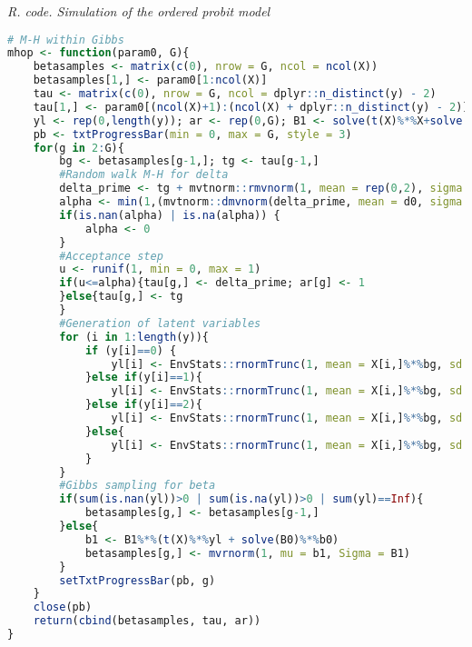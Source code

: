 \begin{enumerate}[leftmargin=*]
\begin{tcolorbox}[enhanced,width=4.67in,center upper,
	fontupper=\large\bfseries,drop shadow southwest,sharp corners]
	\textit{R. code. Simulation of the ordered probit model}
	\begin{VF}
		\begin{lstlisting}[language=R]
# M-H within Gibbs
mhop <- function(param0, G){
	betasamples <- matrix(c(0), nrow = G, ncol = ncol(X))
	betasamples[1,] <- param0[1:ncol(X)]
	tau <- matrix(c(0), nrow = G, ncol = dplyr::n_distinct(y) - 2)
	tau[1,] <- param0[(ncol(X)+1):(ncol(X) + dplyr::n_distinct(y) - 2)]
	yl <- rep(0,length(y)); ar <- rep(0,G); B1 <- solve(t(X)%*%X+solve(B0))
	pb <- txtProgressBar(min = 0, max = G, style = 3)
	for(g in 2:G){
		bg <- betasamples[g-1,]; tg <- tau[g-1,]
		#Random walk M-H for delta
		delta_prime <- tg + mvtnorm::rmvnorm(1, mean = rep(0,2), sigma = VarProp)
		alpha <- min(1,(mvtnorm::dmvnorm(delta_prime, mean = d0, sigma = D0)*exp(-LogLikOP(c(bg, delta_prime)) + LogLikOP(c(bg, tg))))/mvtnorm::dmvnorm(tg, mean = d0, sigma = D0))
		if(is.nan(alpha) | is.na(alpha)) {
			alpha <- 0
		}
		#Acceptance step
		u <- runif(1, min = 0, max = 1)
		if(u<=alpha){tau[g,] <- delta_prime; ar[g] <- 1
		}else{tau[g,] <- tg
		}
		#Generation of latent variables
		for (i in 1:length(y)){
			if (y[i]==0) {
				yl[i] <- EnvStats::rnormTrunc(1, mean = X[i,]%*%bg, sd = 1, max = 0)
			}else if(y[i]==1){
				yl[i] <- EnvStats::rnormTrunc(1, mean = X[i,]%*%bg, sd = 1, min = 0, max = exp(tau[g,1]))
			}else if(y[i]==2){
				yl[i] <- EnvStats::rnormTrunc(1, mean = X[i,]%*%bg, sd = 1, min = exp(tau[g,1]), max = exp(tau[g,2])+exp(tau[g,1]))
			}else{
				yl[i] <- EnvStats::rnormTrunc(1, mean = X[i,]%*%bg, sd = 1, min = exp(tau[g,2])+exp(tau[g,1]))
			}
		}
		#Gibbs sampling for beta
		if(sum(is.nan(yl))>0 | sum(is.na(yl))>0 | sum(yl)==Inf){
			betasamples[g,] <- betasamples[g-1,]
		}else{
			b1 <- B1%*%(t(X)%*%yl + solve(B0)%*%b0)
			betasamples[g,] <- mvrnorm(1, mu = b1, Sigma = B1)
		}
		setTxtProgressBar(pb, g)
	}
	close(pb)
	return(cbind(betasamples, tau, ar))
}
\end{lstlisting}
	\end{VF}
\end{tcolorbox} 


\end{enumerate}
